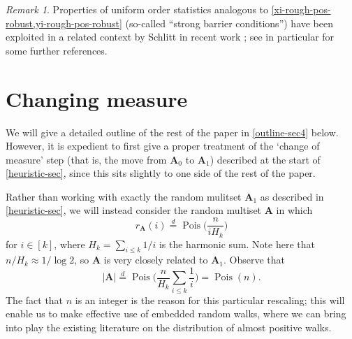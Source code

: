 \documentclass[11pt,reqno]{amsart}
\numberwithin{equation}{section}
\theoremstyle{definition}
\theoremstyle{remark}
\newtheorem*{remark}{Remark}
\newcommand{\mbf}{\mathbf}
\newcommand\Pois{\operatorname{Pois}}
\renewcommand{\le}{\leqslant}
\newcommand\samedist{\overset{d}{=}}
\begin{document}
\begin{remark}
Properties of uniform order statistics analogous to \cref{xi-rough-pos-robust,yi-rough-pos-robust} (so-called ``strong barrier conditions'') have been exploited in a related context by Schlitt in recent work \cite{schlitt}; see in particular \cite[page 5]{schlitt} for some further references.
\end{remark}

\section{Changing measure}\label{new-sec-3}
We will give a detailed outline of the rest of the paper in \cref{outline-sec4} below. However, it is expedient to first give a proper treatment of the `change of measure' step (that is, the move from $\mbf{A}_0$ to $\mbf{A}_1$) described at the start of \cref{heuristic-sec}, since this sits slightly to one side of the rest of the paper. 

Rather than working with exactly the random mulitset $\mbf{A}_1$ as described in \cref{heuristic-sec}, we will instead consider the random multiset $\mbf{A}$ in which  \begin{equation}\label{a-law} r_{\mbf{A}}(i) \samedist \Pois\big(\frac{n}{iH_k}\big)\end{equation} for $i \in [k]$, where $H_k = \sum_{i \le k} 1/i$ is the harmonic sum. Note here that $n/H_k \approx 1/\log 2$, so $\mbf{A}$ is very closely related to $\mbf{A}_1$. Observe that 
\[ \big|\mbf{A} \big| \samedist \Pois \big( \frac{n}{H_k} \sum_{i \le k} \frac{1}{i}\big) = \Pois(n).\]
The fact that $n$ is an integer is the reason for this particular rescaling; this will enable us to make effective use of embedded random walks, where we can bring into play the existing literature on the distribution of almost positive walks.
\end{document}
